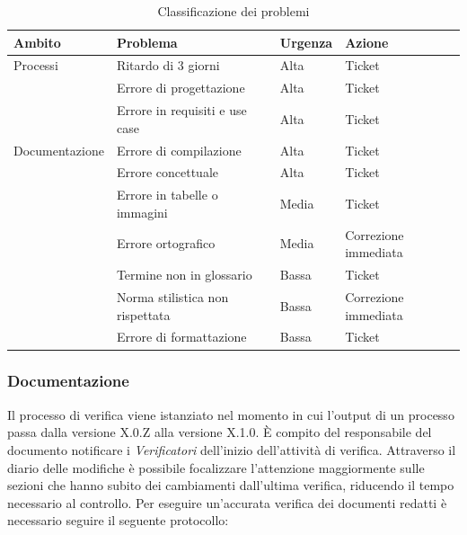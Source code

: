 \documentclass[12pt,a4paper]{article}
\begin{document}
\begin{table}
\begin{tabular}{p{} p{} p{} p{}}
\toprule
\textbf{Ambito}	&	\textbf{Problema}	&	\textbf{Urgenza}	&	\textbf{Azione}\\
\midrule
\midrule
Processi & Ritardo di 3 giorni & Alta & Ticket \\
\midrule
& Errore di progettazione & Alta & Ticket \\
\midrule
& Errore in requisiti e use case & Alta & Ticket \\
\midrule
\midrule
Documentazione & Errore di compilazione & Alta & Ticket \\
\midrule
& Errore concettuale & Alta & Ticket \\
\midrule
& Errore in tabelle o immagini & Media & Ticket \\
\midrule
& Errore ortografico & Media & Correzione immediata \\
\midrule
& Termine non in glossario & Bassa & Ticket \\
\midrule
& Norma stilistica non rispettata & Bassa & Correzione immediata \\
\midrule
& Errore di formattazione & Bassa & Ticket \\
\bottomrule
\end{tabular}
\caption{Classificazione dei problemi}
\label{tabCalssificazioneProb}
\end{table}
  
\subsubsection{Documentazione}
Il processo di verifica viene istanziato nel momento in cui l'output di un processo passa dalla versione X.0.Z alla versione X.1.0. È compito del responsabile del documento notificare i \emph{Verificatori} dell'inizio dell'attività di verifica. Attraverso il diario delle modifiche è possibile focalizzare l'attenzione maggiormente sulle sezioni che hanno subito dei cambiamenti dall'ultima verifica, riducendo il tempo necessario al controllo. Per eseguire un'accurata verifica dei documenti redatti è necessario seguire il seguente protocollo:
\end{document}
